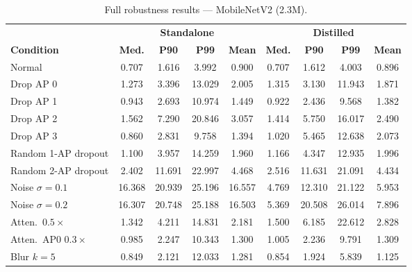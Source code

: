 \begin{table}[H]
\centering
\caption{Full robustness results --- MobileNetV2 (2.3M).}
\label{tab:app:robust_mobilenet}
\small
\begin{tabular}{@{}lcccc|cccc@{}}
\toprule
 & \multicolumn{4}{c|}{\textbf{Standalone}} & \multicolumn{4}{c}{\textbf{Distilled}} \\
\textbf{Condition} & \textbf{Med.} & \textbf{P90} & \textbf{P99} & \textbf{Mean} & \textbf{Med.} & \textbf{P90} & \textbf{P99} & \textbf{Mean} \\
\midrule
Normal                 & 0.707 & 1.616 & 3.992  & 0.900 & 0.707 & 1.612 & 4.003  & 0.896 \\
Drop AP 0              & 1.273 & 3.396 & 13.029 & 2.005 & 1.315 & 3.130 & 11.943 & 1.871 \\
Drop AP 1              & 0.943 & 2.693 & 10.974 & 1.449 & 0.922 & 2.436 & 9.568  & 1.382 \\
Drop AP 2              & 1.562 & 7.290 & 20.846 & 3.057 & 1.414 & 5.750 & 16.017 & 2.490 \\
Drop AP 3              & 0.860 & 2.831 & 9.758  & 1.394 & 1.020 & 5.465 & 12.638 & 2.073 \\
Random 1-AP dropout    & 1.100 & 3.957 & 14.259 & 1.960 & 1.166 & 4.347 & 12.935 & 1.996 \\
Random 2-AP dropout    & 2.402 & 11.691& 22.997 & 4.468 & 2.516 & 11.631& 21.091 & 4.434 \\
Noise $\sigma{=}0.1$   & 16.368& 20.939& 25.196 & 16.557& 4.769 & 12.310& 21.122 & 5.953 \\
Noise $\sigma{=}0.2$   & 16.307& 20.748& 25.188 & 16.503& 5.369 & 20.508& 26.014 & 7.896 \\
Atten.\ $0.5\times$    & 1.342 & 4.211 & 14.831 & 2.181 & 1.500 & 6.185 & 22.612 & 2.828 \\
Atten.\ AP0 $0.3\times$& 0.985 & 2.247 & 10.343 & 1.300 & 1.005 & 2.236 & 9.791  & 1.309 \\
Blur $k{=}5$           & 0.849 & 2.121 & 12.033 & 1.281 & 0.854 & 1.924 & 5.839  & 1.125 \\
\bottomrule
\end{tabular}
\end{table}

